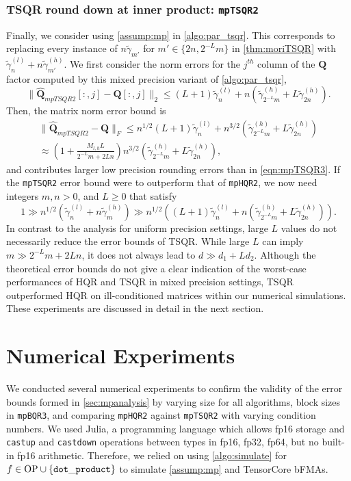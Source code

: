 \documentclass[review,onefignum,onetabnum]{siamart190516}
\newcommand{\bb}[1]{\mathbf{#1}}
\begin{document}
\subsubsection{TSQR round down at inner product: {\tt mpTSQR2}}
Finally, we consider using \cref{assump:mp} in \cref{algo:par_tsqr}.
This corresponds to replacing every instance of $n\tilde{\gamma}_{m'}$ for $m'\in\{2n, 2^{-L}m\}$ in \cref{thm:moriTSQR} with $\tilde{\gamma}_n^{(l)} + n\tilde{\gamma}_{m'}^{(h)}$.
We first consider the norm errors for the $j^{th}$ column of the $\bb{Q}$ factor computed by this mixed precision variant of \cref{algo:par_tsqr},
\begin{equation}
	\|\hat{\bb{Q}}_{mpTSQR2}[:,j] -\bb{Q}[:,j]\|_2 \leq (L+1)\tilde{\gamma}_n^{(l)} +n(\tilde{\gamma}_{2^{-L}m}^{(h)} + L\tilde{\gamma}_{ 2n}^{(h)}).\label{eqn:mptsqr2Qcol}
\end{equation} 
Then, the matrix norm error bound is 
\begin{align}
\|\hat{\bb{Q}}_{mpTSQR2}-\bb{Q}\|_F \leq n^{1/2}(L+1)\tilde{\gamma}_n^{(l)} +n^{3/2}(\tilde{\gamma}_{2^{-L}m}^{(h)} + L\tilde{\gamma}_{ 2n}^{(h)})\\
\approx \left(1+ \frac{M_{l,h}L}{2^{-L}m+ 2Ln}\right)n^{3/2}(\tilde{\gamma}_{2^{-L}m}^{(h)} + L\tilde{\gamma}_{ 2n}^{(h)}),\label{eqn:mptsqr2Q}
\end{align}
and contributes larger low precision rounding errors than in \cref{eqn:mpTSQR3}.
If the {\tt mpTSQR2} error bound were to outperform that of {\tt mpHQR2}, we now need integers $m, n > 0$, and $L\geq 0$ that satisfy
\begin{equation*}
1\gg n^{1/2}\left(\tilde{\gamma}_{n}^{(l)} + n\tilde{\gamma}_{m}^{(h)}\right) \gg n^{1/2}\left((L+1)\tilde{\gamma}_n^{(l)} +n(\tilde{\gamma}_{2^{-L}m}^{(h)} + L\tilde{\gamma}_{ 2n}^{(h)})\right).%
\end{equation*}
In contrast to the analysis for uniform precision settings, large $L$ values do not necessarily reduce the error bounds of TSQR. 
While large $L$ can imply $m\gg 2^{-L}m+2Ln$, it does not always lead to $d \gg d_1+Ld_2$.
Although the theoretical error bounds do not give a clear indication of the worst-case performances of HQR and TSQR in mixed precision settings, TSQR outperformed HQR on ill-conditioned matrices within our numerical simulations.
These experiments are discussed in detail in the next section.
\section{Numerical Experiments}\label{sec:NE}
%
We conducted several numerical experiments to confirm the validity of the error bounds formed in \cref{sec:mpanalysis} by varying size for all algorithms, block sizes in {\tt mpBQR3}, and comparing {\tt mpHQR2} against {\tt mpTSQR2} with varying condition numbers.
We used Julia, a programming language which allows fp16 storage and {\tt castup} and {\tt castdown} operations between types in {fp16, fp32, fp64}, but no built-in fp16 arithmetic.
Therefore, we relied on using \cref{algo:simulate} for $f\in \text{OP} \cup\{{\tt dot\_product}\}$ to simulate \cref{assump:mp} and TensorCore bFMAs.\par
\end{document}
